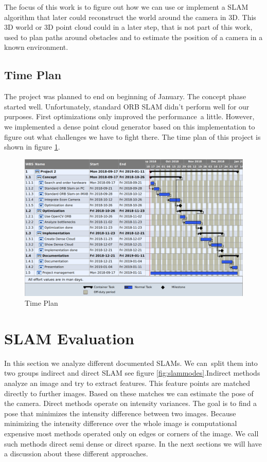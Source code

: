 \documentclass[11pt,a4paper,titlepage,oneside]{report}
\begin{document}
The focus of this work is to figure out how we can use or implement a SLAM algorithm that later could reconstruct the world around the camera in 3D. This 3D world or 3D point cloud could in a later step, that is not part of this work, used to plan paths around obstacles and to estimate the position of a camera in a known environment.

\section{Time Plan}

The project was planned to end on beginning of January. The concept phase started well. Unfortunately, standard ORB SLAM didn’t perform well for our purposes. First optimizations only improved the performance a little. However, we implemented a dense point cloud generator based on this implementation to figure out what challenges we have to fight there. The time plan of this project is shown in figure \ref{fig:timeplan}.
\begin{figure}[H]
	\includegraphics[width=1.0\textwidth]{img/timeplan.png}
	\caption{Time Plan}\label{fig:timeplan}
\end{figure}

\chapter{SLAM Evaluation}

In this section we analyze different documented SLAMs. We can split them into two groups indirect and direct SLAM see figure \ref{fig:slammodes}.Indirect methods analyze an image and try to extract features. This feature points are matched directly to further images. Based on these matches we can estimate the pose of the camera. Direct methods operate on intensity variances. The goal is to find a pose that minimizes the intensity difference between two images. Because minimizing the intensity difference over the whole image is computational expensive most methods operated only on edges or corners of the image. We call such methods direct semi dense or direct sparse. In the next sections we will have a discussion about these different approaches.
\end{document}
